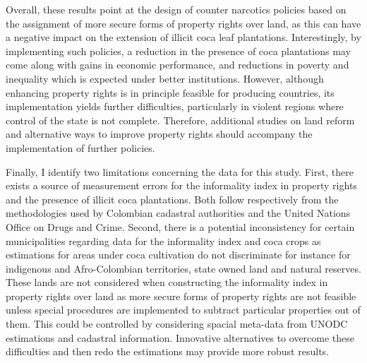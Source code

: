 \documentclass[a4paper, 12pt]{article}
\begin{document}
Overall, these results point at the design of counter narcotics policies based on the assignment of more secure forms of property rights over land, as this can have a negative impact on the extension of illicit coca leaf plantations. Interestingly, by implementing such policies, a reduction in the presence of coca plantations may come along with gains in economic performance, and reductions in poverty and inequality which is expected under better institutions. However, although enhancing property rights is in principle feasible for producing countries, its implementation yields further difficulties, particularly in violent regions where control of the state is not complete. Therefore, additional studies on land reform and alternative ways to improve property rights should accompany the implementation of further policies.

Finally, I identify two limitations concerning the data for this study. First, there exists a source of measurement errors for the informality index in property rights and the presence of illicit coca plantations. Both follow respectively from the methodologies used by Colombian cadastral authorities and the United Nations Office on Drugs and Crime. Second, there is a potential inconsistency for certain municipalities regarding data for the informality index and coca crops as estimations for areas under coca cultivation do not discriminate for instance for indigenous and Afro-Colombian territories, state owned land and natural reserves. These lands are not considered when constructing the informality index in property rights over land as more secure forms of property rights are not feasible unless special procedures are implemented to subtract particular properties out of them. This could be controlled by considering spacial meta-data from UNODC estimations and cadastral information. Innovative alternatives to overcome these difficulties and then redo the estimations may provide more robust results.
\end{document}

